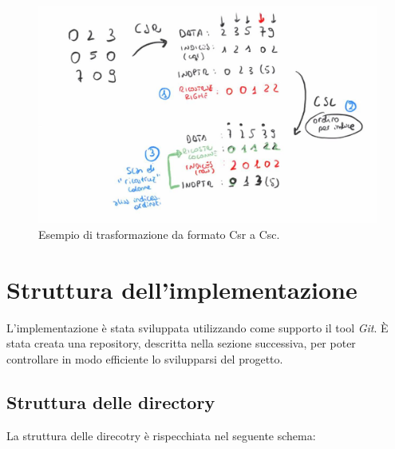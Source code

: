 \documentclass[]{IEEEtran}
\begin{document}
	\begin{figure}[H]
		\includegraphics[scale=0.25]{csr-to-csc.jpg}
		\caption{Esempio di trasformazione da formato Csr a Csc.}
	\end{figure}

	
\section{Struttura dell'implementazione} 
\label{struttura}
	L'implementazione è stata sviluppata utilizzando come supporto il tool \textit{Git}. È stata creata una repository, descritta nella sezione successiva, per poter controllare in modo efficiente lo svilupparsi del progetto. 
	\newpage
	\subsection{Struttura delle directory}
	La struttura delle direcotry è rispecchiata nel seguente schema:
	\mbox{}
\end{document}
